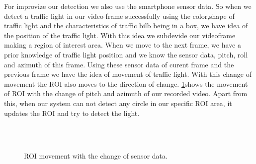 For improvize our detection we also use the smartphone sensor data.
So when we detect a traffic light in our video frame successfully using the color,shape of traffic light and the characteristics of traffic bilb being in a box, we have idea of the position of the traffic light.
With this idea we subdevide our videoframe making a region of interest area.
When we move to the next frame, we have a prior knowledge of traffic light position and we know the sensor data, pitch, roll and azimuth of this frame.
Using these sensor data of curent frame and the previous frame we have the idea of movement of traffic light.
With this change of movement the ROI also moves to the direction of change.
\ref{f:rec_mv}shows the movement of ROI with the change of pitch and azimuth of our recorded video.
Apart from this, when our system can not detect any circle in our specific ROI area, it updates the ROI and try to detect the light.

\begin{figure}[!ht]
\centering
{}\\
\\

\caption{ROI movement with the change of sensor data.}
\label{f:rec_mv}
\end{figure}


